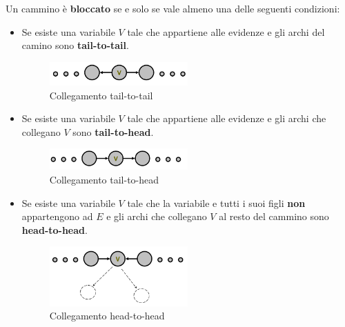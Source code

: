 \begin{definizione}
    Un cammino è \textbf{bloccato} se e solo se vale almeno una delle seguenti
    condizioni:
    \begin{itemize}
        \item Se esiste una variabile $V$ tale che appartiene alle evidenze e
              gli archi del camino sono \textbf{tail-to-tail}.
              \begin{figure}[!ht]
                  \centering
                  \includegraphics[width=0.5\textwidth]{./img/Reti/TailToTail.png}
                  \caption{Collegamento tail-to-tail}
                  \label{fig:tail-to-tail}
              \end{figure}
        \item Se esiste una variabile $V$ tale che appartiene alle evidenze e
              gli archi che collegano $V$ sono \textbf{tail-to-head}.
              \begin{figure}[!ht]
                  \centering
                  \includegraphics[width=0.5\textwidth]{./img/Reti/TailToHead.png}
                  \caption{Collegamento tail-to-head}
                  \label{fig:tail-to-head}
              \end{figure}
        \item Se esiste una variabile $V$ tale che la variabile e tutti i suoi figli
              \textbf{non} appartengono ad $E$ e gli archi che collegano $V$ al
              resto del cammino sono \textbf{head-to-head}.
              \begin{figure}[!ht]
                  \centering
                  \includegraphics[width=0.5\textwidth]{./img/Reti/HeadToHead.png}
                  \caption{Collegamento head-to-head}
                  \label{fig:head-to-head}
              \end{figure}
    \end{itemize}
\end{definizione}
